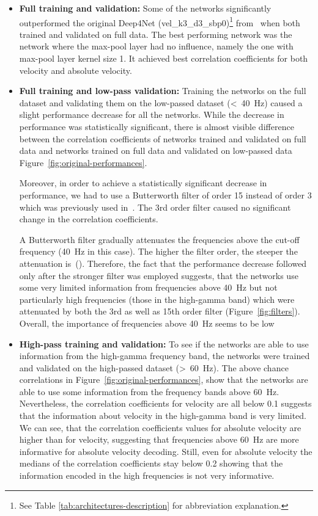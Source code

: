 \begin{itemize}
    \item \textbf{Full training and validation:} Some of the networks significantly outperformed the original Deep4Net (vel\_k3\_d3\_sbp0)\footnote{See Table \ref{tab:architectures-description} for abbreviation explanation.} from~\cite{Hammer-2021} when both trained and validated on full data.
    The best performing network was the network where the max-pool layer had no influence, namely the one with max-pool layer kernel size 1. It achieved best correlation coefficients for both velocity and absolute velocity.
    
    \item \textbf{Full training and low-pass validation:} Training the networks on the full dataset and validating them on the low-passed dataset (<~40~Hz) caused a slight performance decrease for all the networks. While the decrease in performance was statistically significant, there is almost visible difference between the correlation coefficients of networks trained and validated on full data and networks trained on full data and validated on low-passed data Figure~\ref{fig:original-performances}.
    
    Moreover, in order to achieve a statistically significant decrease in performance, we had to use a Butterworth filter of order 15 instead of order 3 which was previously used in~\cite{Hammer-2021}. The 3rd order filter caused no significant change in the correlation coefficients. 
    
    A Butterworth filter gradually attenuates the frequencies above the cut-off frequency (40~Hz in this case).
    The higher the filter order, the steeper the attenuation is~(\cite{butterworth1930theory}).
    Therefore, the fact that the performance decrease followed only after the stronger filter was employed suggests, that the networks use some very limited information from frequencies above 40~Hz but not particularly high frequencies (those in the high-gamma band) which were attenuated by both the 3rd as well as 15th order filter (Figure~\ref{fig:filters}).
    Overall, the importance of frequencies above 40~Hz seems to be low 
    
    \item \textbf{High-pass training and validation:} To see if the networks are able to use information from the high-gamma frequency band, the networks were trained and validated on the high-passed dataset (>~60~Hz).
    The above chance correlations in Figure~\ref{fig:original-performances}, show that the networks are able to use some information from the frequency bands above 60~Hz. 
    Nevertheless, the correlation coefficients for velocity are all below 0.1 suggests that the information about velocity in the high-gamma band is very limited.
    We can see, that the correlation coefficients values for absolute velocity are higher than for velocity, suggesting that frequencies above 60~Hz are more informative for absolute velocity decoding.
    Still, even for absolute velocity the medians of the correlation coefficients stay below 0.2 showing that the information encoded in the high frequencies is not very informative.
    

\end{itemize}
